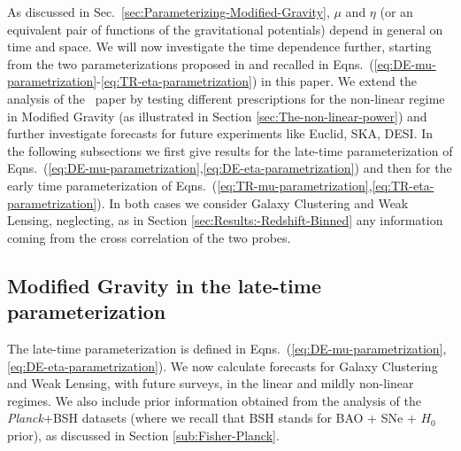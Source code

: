 As discussed in Sec.\ \ref{sec:Parameterizing-Modified-Gravity}, $\mu$ and $\eta$ (or an equivalent pair of functions of the gravitational potentials) depend in general on time and space. We will now investigate the time dependence further, starting from the two parameterizations proposed in \cite{planck_collaboration_planck_2016} and recalled in Eqns.\ (\ref{eq:DE-mu-parametrization}-\ref{eq:TR-eta-parametrization}) in this paper. We extend the analysis of the \planck\ paper by testing different prescriptions for the non-linear regime in Modified Gravity (as illustrated in Section \ref{sec:The-non-linear-power}) and further investigate forecasts for future experiments like Euclid, SKA, DESI. In the following subsections we first give results for the late-time parameterization of Eqns.\ (\ref{eq:DE-mu-parametrization},\ref{eq:DE-eta-parametrization}) and then for the early time parameterization of Eqns.\ (\ref{eq:TR-mu-parametrization},\ref{eq:TR-eta-parametrization}). In both cases we consider Galaxy Clustering and Weak Lensing, neglecting, as in Section \ref{sec:Results:-Redshift-Binned} any information coming from the cross correlation of the two probes.

\subsection{\label{sub:MG-DE}Modified Gravity in the late-time parameterization}
The late-time parameterization is defined in Eqns.\ (\ref{eq:DE-mu-parametrization},\ref{eq:DE-eta-parametrization}). We now calculate forecasts for Galaxy Clustering and Weak Lensing, with future surveys, in the linear and mildly non-linear regimes.
We also include prior information obtained from
the analysis of the {\it Planck}+BSH datasets (where we recall that BSH stands for BAO + SNe + $H_0$ prior),
as discussed in Section \ref{sub:Fisher-Planck}.

